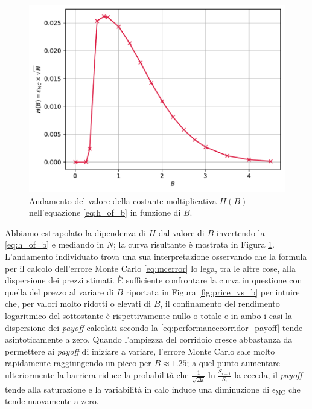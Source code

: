 \begin{figure}[t]
    \centering
    \includegraphics[scale=0.5]{graphs/OptionPriceVsB_HBVsB.pdf}
    \caption{Andamento del valore della costante moltiplicativa $H(B)$ nell'equazione \eqref{eq:h_of_b} in funzione di $B$.}
    \label{fig:HB_vs_B}
\end{figure}

Abbiamo estrapolato la dipendenza di $H$ dal valore di $B$ invertendo la \eqref{eq:h_of_b} e mediando in $N$; la curva risultante è mostrata in Figura \ref{fig:HB_vs_B}. L'andamento individuato trova una sua interpretazione osservando che la formula per il calcolo dell'errore Monte Carlo \eqref{eq:mcerror} lo lega, tra le altre cose, alla dispersione dei prezzi stimati. È sufficiente confrontare la curva in questione con quella del prezzo al variare di $B$ riportata in Figura \ref{fig:price_vs_b} per intuire che, per valori molto ridotti o elevati di $B$, il confinamento del rendimento logaritmico del sottostante è rispettivamente nullo o totale e in ambo i casi la dispersione dei \textit{payoff} calcolati secondo la \eqref{eq:performancecorridor_payoff} tende asintoticamente a zero. Quando l'ampiezza del corridoio cresce abbastanza da permettere ai \textit{payoff} di iniziare a variare, l'errore Monte Carlo sale molto rapidamente raggiungendo un picco per $B\approx 1.25$; a quel punto aumentare ulteriormente la barriera riduce la probabilità che $\frac{1}{\sqrt{\Delta t}}\ln{\frac{S_{i+1}}{S_i}}$ la ecceda, il \textit{payoff} tende alla saturazione e la variabilità in calo induce una diminuzione di $\epsilon_\text{MC}$ che tende nuovamente a zero.

